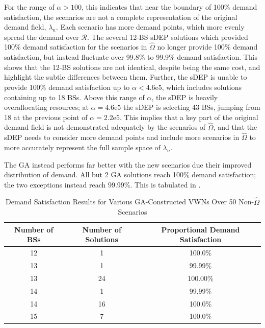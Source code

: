 \documentclass[12pt,dvipsnames]{report}
\newcommand{\expnumber}[2]{{#1}\mathrm{e}{#2}}
\begin{document}
For the range of $\alpha > 100$, this indicates that near the boundary of 100\% demand satisfaction, the scenarios are not a complete representation of the original demand field, $\lambda_n$.  Each scenario has more demand points, which more evenly spread the demand over $\mathcal{R}$.  The several 12-BS sDEP solutions which provided 100\% demand satisfaction for the scenarios in $\hat{\Omega}$ no longer provide 100\% demand satisfaction, but instead fluctuate over 99.8\% to 99.9\% demand satisfaction.  This shows that the 12-BS solutions are not identical, despite being the same cost, and highlight the subtle differences between them.  Further, the sDEP is unable to provide 100\% demand satisfaction up to $\alpha < \expnumber{4.6}{5}$, which includes solutions containing up to 18 BSs.  Above this range of $\alpha$, the sDEP is heavily overallocating resources; at $\alpha = \expnumber{4.6}{5}$ the sDEP is selecting 43 BSs, jumping from 18 at the previous point of $\alpha = \expnumber{2.2}{5}$.  This implies that a key part of the original demand field is not demonstrated adequately by the scenarios of $\hat{\Omega}$, and that the sDEP needs to consider more demand points and include more scenarios in $\hat{\Omega}$ to more accurately represent the full sample space of $\lambda_n$.

The GA instead performs far better with the new scenarios due their improved distribution of demand.  All but 2 GA solutions reach 100\% demand satisfaction; the two exceptions instead reach 99.99\%.  This is tabulated in .

\begin{table}[htp]
	\centering
	\caption[Preliminary Simulation Demand Satisfaction of GA-Constructed VWNs with New Scenarios]{Demand Satisfaction Results for Various GA-Constructed VWNs Over 50 Non-$\hat{\Omega}$ Scenarios}
	\begin{tabular}{|c|c|c|} 
		\hline
		\textbf{Number of BSs} & \textbf{Number of Solutions} & \textbf{Proportional Demand Satisfaction} \\
		\hline
		12 & 1 & 100.0\% \\
		\hline
		13 & 1 & 99.99\% \\
		\hline
		13 & 24 & 100.00\% \\
		\hline
		14 & 1 & 99.99\% \\
		\hline
		14 & 16 & 100.0\% \\
		\hline
		15 & 7 & 100.0\% \\
		\hline
	\end{tabular}
	\label{tab:Prelim_GAEvalDemandSatisfaction}
\end{table}
\end{document}
